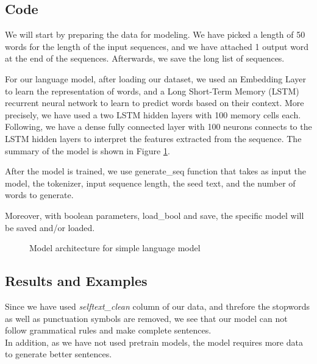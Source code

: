 \documentclass[12pt, a4paper]{article}
\begin{document}
\subsection{Code}
We will start by preparing the data for modeling. 
We have picked a length of 50 words for the length of the input sequences, and we have attached 1 output word at the end of the sequences. Afterwards, we save the long list of sequences.

For our language model, after loading our dataset, we used an Embedding Layer to learn the representation of words, and a Long Short-Term Memory (LSTM) recurrent neural network to learn to predict words based on their context. More precisely, we have used a two LSTM hidden layers with 100 memory cells each. Following, we have a dense fully connected layer with 100 neurons connects to the LSTM hidden layers to interpret the features extracted from the sequence. The summary of the model is shown in Figure \ref{normal-lm_arch}.

After the model is trained, we use generate\_seq function that takes as input the model, the tokenizer, input sequence length, the seed text, and the number of words to generate. 

Moreover, with boolean parameters, load\_bool and save, the specific model will be saved and/or loaded.
\begin{figure}[H]
	\caption{Model architecture for simple language model}
	\label{normal-lm_arch}
\end{figure}

\subsection{Results and Examples}
Since we have used \emph{selftext\_clean} column of our data, and threfore the stopwords as well as punctuation symbols are removed, we see that our model can not follow grammatical rules and make complete sentences. 
\\In addition, as we have not used pretrain models, the model requires more data to generate better sentences. 
\end{document}
